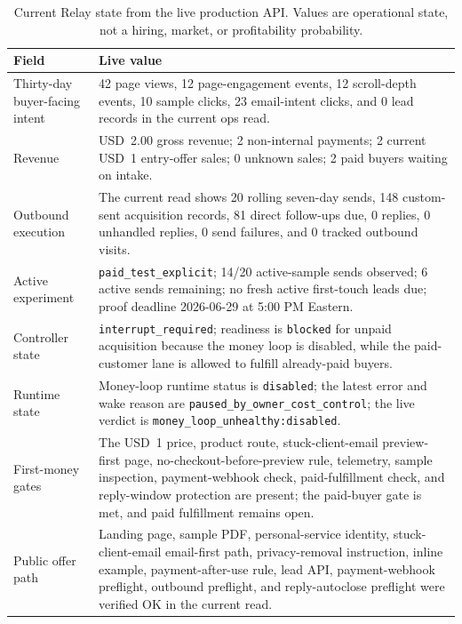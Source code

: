\documentclass[12pt,letterpaper]{article}
\begin{document}
\begin{table}[tbp]
\centering
\small
\caption{Current Relay state from the live production API. Values are operational state, not a hiring, market, or profitability probability.}
\label{tab:current_state}
\begin{tabularx}{\textwidth}{L{0.27\textwidth}Y}
\toprule
{}
\textbf{Field} & \textbf{Live value} \\
\midrule
Thirty-day buyer-facing intent & 42 page views, 12 page-engagement events, 12 scroll-depth events, 10 sample clicks, 23 email-intent clicks, and 0 lead records in the current ops read. \\
Revenue & USD~2.00 gross revenue; 2 non-internal payments; 2 current USD~1 entry-offer sales; 0 unknown sales; 2 paid buyers waiting on intake. \\
Outbound execution & The current read shows 20 rolling seven-day sends, 148 custom-sent acquisition records, 81 direct follow-ups due, 0 replies, 0 unhandled replies, 0 send failures, and 0 tracked outbound visits. \\
Active experiment & \texttt{paid\_test\_explicit}; 14/20 active-sample sends observed; 6 active sends remaining; no fresh active first-touch leads due; proof deadline 2026-06-29 at 5:00 PM Eastern. \\
Controller state & \texttt{interrupt\_required}; readiness is \texttt{blocked} for unpaid acquisition because the money loop is disabled, while the paid-customer lane is allowed to fulfill already-paid buyers. \\
Runtime state & Money-loop runtime status is \texttt{disabled}; the latest error and wake reason are \texttt{paused\_by\_owner\_cost\_control}; the live verdict is \texttt{money\_loop\_unhealthy:disabled}. \\
First-money gates & The USD~1 price, product route, stuck-client-email preview-first page, no-checkout-before-preview rule, telemetry, sample inspection, payment-webhook check, paid-fulfillment check, and reply-window protection are present; the paid-buyer gate is met, and paid fulfillment remains open. \\
Public offer path & Landing page, sample PDF, personal-service identity, stuck-client-email email-first path, privacy-removal instruction, inline example, payment-after-use rule, lead API, payment-webhook preflight, outbound preflight, and reply-autoclose preflight were verified OK in the current read. \\
\bottomrule
\end{tabularx}
\end{table}
\end{document}
